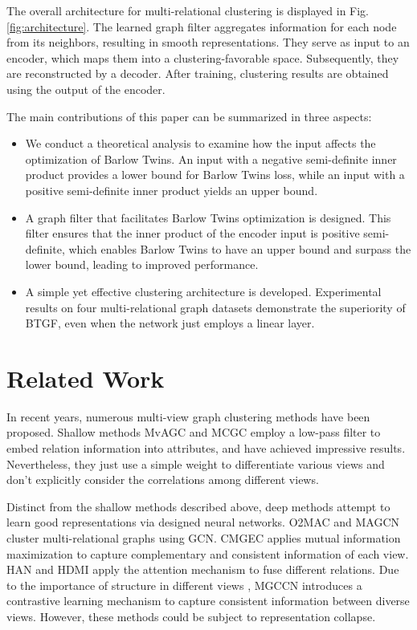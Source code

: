 \documentclass[letterpaper]{article} %
\begin{document}
The overall architecture for multi-relational clustering is displayed in Fig. \ref{fig:architecture}. The learned graph filter aggregates information for each node from its neighbors, resulting in smooth representations. They serve as input to an encoder, which maps them into a clustering-favorable space. Subsequently, they are reconstructed by a decoder. After training, clustering results are obtained using the output of the encoder.

The main contributions of this paper can be summarized in three aspects:
\begin{itemize}
    \item We conduct a theoretical analysis to examine how the input affects the optimization of Barlow Twins. An input with a negative semi-definite inner product provides a lower bound for Barlow Twins loss, while an input with a positive semi-definite inner product yields an upper bound.
    
    \item A graph filter that facilitates Barlow Twins optimization is designed.  This filter ensures that the inner product of the encoder input is positive semi-definite, which enables Barlow Twins to have an upper bound and surpass the lower bound, leading to improved performance.

    \item A simple yet effective clustering architecture is developed. Experimental results on four multi-relational graph datasets demonstrate the superiority of BTGF, even when the network just employs a linear layer.  
\end{itemize}


\section{Related Work}

In recent years, numerous multi-view graph clustering methods have been proposed. Shallow methods MvAGC \cite{lin2021graph} and MCGC \cite{pan2021multi} employ a low-pass filter to embed relation information into attributes, and have achieved impressive results. Nevertheless, they just use a simple weight to differentiate various views and don't explicitly consider the correlations among different views.

Distinct from the shallow methods described above, deep methods attempt to learn good representations via designed neural networks. O2MAC \cite{fan2020one2multi} and MAGCN \cite{cheng2021multi} cluster multi-relational graphs using GCN. CMGEC \cite{wang2021consistent} applies mutual information maximization to capture complementary and consistent information of each view. HAN \cite{10.1145/3308558.3313562} and HDMI \cite{jing2021hdmi} apply the attention mechanism to fuse different relations. Due to the importance of structure in different views \cite{fang2022structure}, MGCCN \cite{10.1016/j.ins.2022.09.042} introduces a contrastive learning mechanism to capture consistent information between diverse views. However, these methods could be subject to representation collapse.
\end{document}
